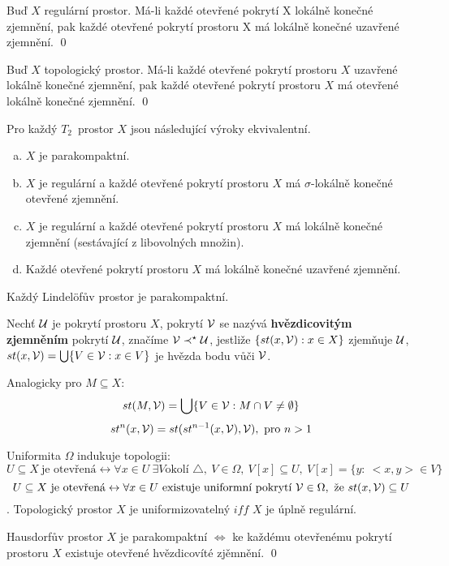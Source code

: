 \documentclass[12pt,a4paper]{article}
\newcommand{\head}[1]{\medskip\noindent {\bf #1}}
\newcommand\Hausd{$T_2$}
\begin{document}
\lemma[2] Buď $X$ regulární prostor. Má-li každé otevřené pokrytí X lokálně
	konečné zjemnění, pak každé otevřené pokrytí prostoru X má lokálně konečné
	uzavřené zjemnění.
\dukaz \qed

\lemma[3] Buď $X$ topologický prostor. Má-li každé otevřené pokrytí prostoru
	$X$ uzavřené lokálně konečné zjemnění, pak každé otevřené pokrytí prostoru
	$X$ má otevřené lokálně konečné zjemnění.
\dukaz \qed

\begin{veta}
Pro každý \Hausd~prostor $X$ jsou následující výroky ekvivalentní.
	\begin{enumerate}[(a)]
		\item $X$ je parakompaktní.
		\item $X$ je regulární a každé otevřené pokrytí prostoru $X$ má
			$\sigma$-lokálně konečné otevřené zjemnění.
		\item $X$ je regulární a každé otevřené pokrytí prostoru $X$ má lokálně
			konečné zjemnění (sestávající z libovolných množin).
		\item Každé otevřené pokrytí prostoru $X$ má lokálně konečné uzavřené
			zjemnění.
	\end{enumerate}
\end{veta}

\head {Důsledek:} Každý Lindelöfův prostor je parakompaktní.

 Nechť $\mathcal{ U }$ je pokrytí prostoru $X$, pokrytí $\mathcal{ V }$ se nazývá {\bf
	hvězdicovitým zjemněním} pokrytí $\mathcal{ U }$, značíme $\mathcal{ V } \prec^\star \mathcal{ U }$,
	jestliže $\{st(x,\mathcal{ V }) : x \in X\}$ zjemňuje $\mathcal{ U }$, $st(x, \mathcal{ V }) = \bigcup
	\{ V \in \mathcal{ V } : x \in V\}$ je hvězda bodu vůči $\mathcal{ V }$.

	Analogicky pro $M \subseteq X$:
		$$st(M, \mathcal{ V }) = \bigcup \{ V \in \mathcal{ V } : M \cap V \neq \emptyset \}$$
		$$st^n(x, \mathcal{ V }) = st(st^{n-1}(x, \mathcal{ V }), \mathcal{ V }),~\text{pro } n > 1$$

\head {Poznámka:} Uniformita $\Omega$ indukuje topologii:
	$$U \subseteq X~\text{je otevřená} \leftrightarrow \forall x \in U~\exists V \text{okolí } \triangle,~V \in \Omega,~V[x] \subseteq U,~V[x] = \{ y :~<x,y> \in V\}$$
	$$U \subseteq X~\text{je otevřená} \leftrightarrow \forall x \in U~\text{existuje uniformní pokrytí } \mathcal{ V } \in \Omega,\text{ že } st(x, \mathcal{ V }) \subseteq U$$.
	Topologický prostor $X$ je uniformizovatelný $iff$ $X$ je úplně regulární.

\veta Hausdorfův prostor $X$ je parakompaktní $\iff$ ke každému otevřenému
	pokrytí prostoru $X$ existuje otevřené hvězdicovíté zjěmnění.
\dukaz \qed
\end{document}
